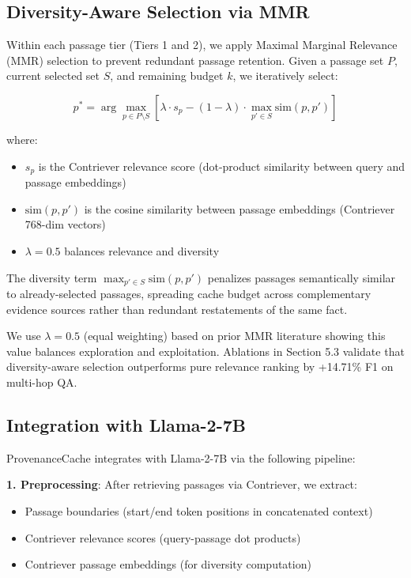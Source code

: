 \subsection{Diversity-Aware Selection via MMR}

Within each passage tier (Tiers 1 and 2), we apply Maximal Marginal Relevance (MMR) selection to prevent redundant passage retention. Given a passage set $P$, current selected set $S$, and remaining budget $k$, we iteratively select:

\begin{equation}
p^* = \arg\max_{p \in P \setminus S} \left[ \lambda \cdot s_p - (1-\lambda) \cdot \max_{p' \in S} \text{sim}(p, p') \right]
\end{equation}

where:
\begin{itemize}
\item $s_p$ is the Contriever relevance score (dot-product similarity between query and passage embeddings)
\item $\text{sim}(p, p')$ is the cosine similarity between passage embeddings (Contriever 768-dim vectors)
\item $\lambda = 0.5$ balances relevance and diversity
\end{itemize}

The diversity term $\max_{p' \in S} \text{sim}(p, p')$ penalizes passages semantically similar to already-selected passages, spreading cache budget across complementary evidence sources rather than redundant restatements of the same fact.

We use $\lambda = 0.5$ (equal weighting) based on prior MMR literature showing this value balances exploration and exploitation. Ablations in Section 5.3 validate that diversity-aware selection outperforms pure relevance ranking by +14.71\% F1 on multi-hop QA.

\subsection{Integration with Llama-2-7B}

ProvenanceCache integrates with Llama-2-7B via the following pipeline:

\textbf{1. Preprocessing}: After retrieving passages via Contriever, we extract:
\begin{itemize}
\item Passage boundaries (start/end token positions in concatenated context)
\item Contriever relevance scores (query-passage dot products)
\item Contriever passage embeddings (for diversity computation)
\end{itemize}

